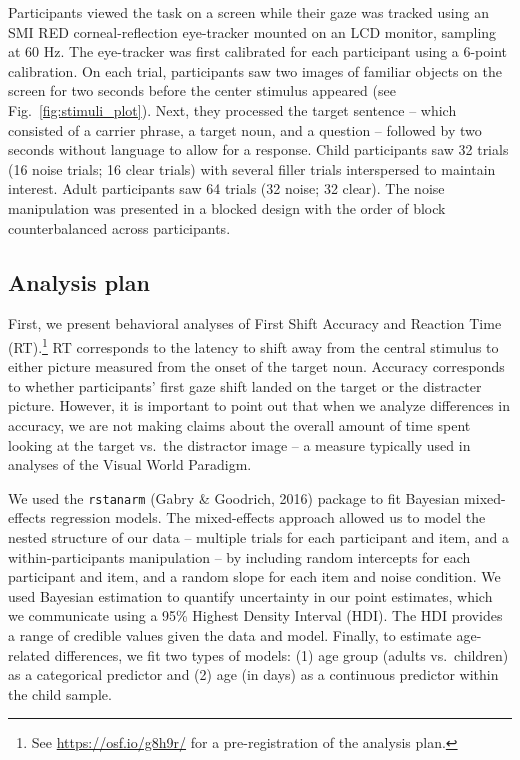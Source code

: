 \documentclass[10pt, letterpaper]{article}
\begin{document}
Participants viewed the task on a screen while their gaze was tracked
using an SMI RED corneal-reflection eye-tracker mounted on an LCD
monitor, sampling at 60 Hz. The eye-tracker was first calibrated for
each participant using a 6-point calibration. On each trial,
participants saw two images of familiar objects on the screen for two
seconds before the center stimulus appeared (see
Fig.~\ref{fig:stimuli_plot}). Next, they processed the target sentence
-- which consisted of a carrier phrase, a target noun, and a question --
followed by two seconds without language to allow for a response. Child
participants saw 32 trials (16 noise trials; 16 clear trials) with
several filler trials interspersed to maintain interest. Adult
participants saw 64 trials (32 noise; 32 clear). The noise manipulation
was presented in a blocked design with the order of block
counterbalanced across participants.

\subsection{Analysis plan}\label{analysis-plan}

First, we present behavioral analyses of First Shift Accuracy and
Reaction Time (RT).\footnote{See \url{https://osf.io/g8h9r/} for a
  pre-registration of the analysis plan.} RT corresponds to the latency
to shift away from the central stimulus to either picture measured from
the onset of the target noun. Accuracy corresponds to whether
participants' first gaze shift landed on the target or the distracter
picture. However, it is important to point out that when we analyze
differences in accuracy, we are not making claims about the overall
amount of time spent looking at the target vs.~the distractor image -- a
measure typically used in analyses of the Visual World Paradigm.

We used the \texttt{rstanarm} (Gabry \& Goodrich, 2016) package to fit
Bayesian mixed-effects regression models. The mixed-effects approach
allowed us to model the nested structure of our data -- multiple trials
for each participant and item, and a within-participants manipulation --
by including random intercepts for each participant and item, and a
random slope for each item and noise condition. We used Bayesian
estimation to quantify uncertainty in our point estimates, which we
communicate using a 95\% Highest Density Interval (HDI). The HDI
provides a range of credible values given the data and model. Finally,
to estimate age-related differences, we fit two types of models: (1) age
group (adults vs.~children) as a categorical predictor and (2) age (in
days) as a continuous predictor within the child sample.
\end{document}
